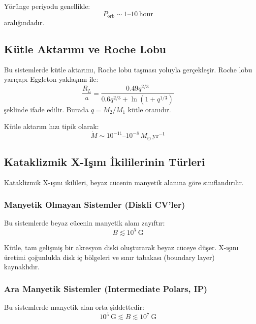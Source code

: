 Yörünge periyodu genellikle:
\begin{equation}
P_{\mathrm{orb}} \sim 1\text{--}10\ \mathrm{hour}
\end{equation}
aralığındadır.

\subsection{Kütle Aktarımı ve Roche Lobu}

Bu sistemlerde kütle aktarımı, Roche lobu taşması yoluyla gerçekleşir. Roche lobu yarıçapı Eggleton yaklaşımı ile:
\begin{equation}
\frac{R_L}{a} = \frac{0.49q^{2/3}}{0.6q^{2/3} + \ln(1+q^{1/3})}
\end{equation}
şeklinde ifade edilir. Burada $q = M_2/M_1$ kütle oranıdır.

Kütle aktarım hızı tipik olarak:
\begin{equation}
\dot{M} \sim 10^{-11} \text{--} 10^{-8}\, M_\odot\,\mathrm{yr^{-1}}
\end{equation}

\subsection{Kataklizmik X-Işını İkililerinin Türleri}

Kataklizmik X-ışını ikilileri, beyaz cücenin manyetik alanına göre sınıflandırılır.

\subsubsection{Manyetik Olmayan Sistemler (Diskli CV'ler)}

Bu sistemlerde beyaz cücenin manyetik alanı zayıftır:
\begin{equation}
B \lesssim 10^5\ \mathrm{G}
\end{equation}

Kütle, tam gelişmiş bir akresyon diski oluşturarak beyaz cüceye düşer. X-ışını üretimi çoğunlukla disk iç bölgeleri ve sınır tabakası (boundary layer) kaynaklıdır.

\subsubsection{Ara Manyetik Sistemler (Intermediate Polars, IP)}

Bu sistemlerde manyetik alan orta şiddettedir:
\begin{equation}
10^5\ \mathrm{G} \lesssim B \lesssim 10^7\ \mathrm{G}
\end{equation}

